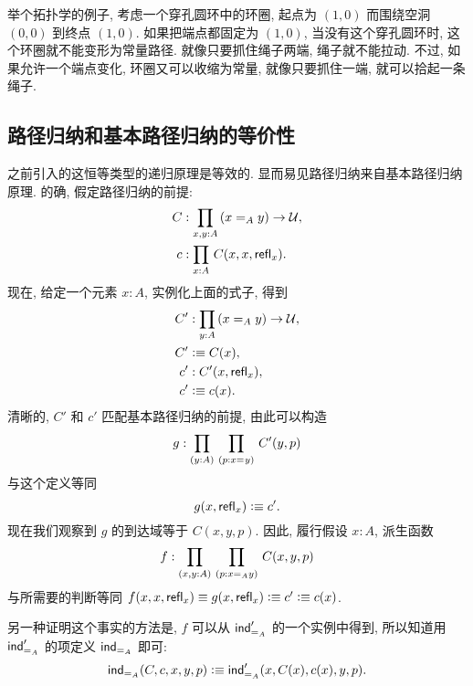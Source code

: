 \begin{rmk}
    举个拓扑学的例子, 考虑一个穿孔圆环中的环圈, 起点为 $(1,0)$ 而围绕空洞 $(0,0)$ 到终点 $(1,0)$.
    如果把端点都固定为 $(1,0)$, 当没有这个穿孔圆环时, 这个环圈就不能变形为常量路径.
    就像只要抓住绳子两端, 绳子就不能拉动.
    不过, 如果允许一个端点变化, 环圈又可以收缩为常量, 就像只要抓住一端, 就可以拾起一条绳子.
\end{rmk}

%
%

\subsection{路径归纳和基本路径归纳的等价性}

之前引入的这恒等类型的递归原理是等效的.
显而易见路径归纳来自基本路径归纳原理.
的确, 假定路径归纳的前提:
\begin{align*}
    C &: \prd{x,y:A}(\id[A]{x}{y}) \to \UU,\\
    c &: \prd{x:A} C(x,x,\refl{x}).
\end{align*}
现在, 给定一个元素 $x:A$, 实例化上面的式子, 得到
\begin{align*}
    C' &: \prd{y:A} (\id[A]{x}{y}) \to \UU, \\
    C' &\defeq C(x), \\
    c' &: C'(x,\refl{x}), \\
    c' &\defeq c(x).
\end{align*}
清晰的, $C'$ 和 $c'$ 匹配基本路径归纳的前提, 由此可以构造
\begin{equation*}
    g : \prd{y:A}{p : \id{x}{y}} C'(y,p)
\end{equation*}
与这个定义等同 \[ g(x,\mathsf{refl}_{x}) \vcentcolon\equiv c'.\]
现在我们观察到 $g$ 的到达域等于 $C(x,y,p)$.
因此, 履行假设 $x:A$, 派生函数 \[ f : \prd{x,y:A}{p : \id[A]{x}{y}} C(x,y,p) \]
与所需要的判断等同 $f(x,x,\mathsf{refl}_{x}) \equiv g(x,\mathsf{refl}_{x}) \vcentcolon\equiv c' \vcentcolon\equiv c(x)$.

另一种证明这个事实的方法是, $f$ 可以从 $\mathsf{ind}_{=_{A}}'$ 的一个实例中得到, 所以知道用 $\mathsf{ind}_{=_{A}}'$ 的项定义 $\mathsf{ind}_{=_{A}}$ 即可: \[ \mathsf{ind}_{=_{A}}(C,c,x,y,p) \vcentcolon\equiv \mathsf{ind}_{=_{A}}'(x,C(x),c(x),y,p). \]

